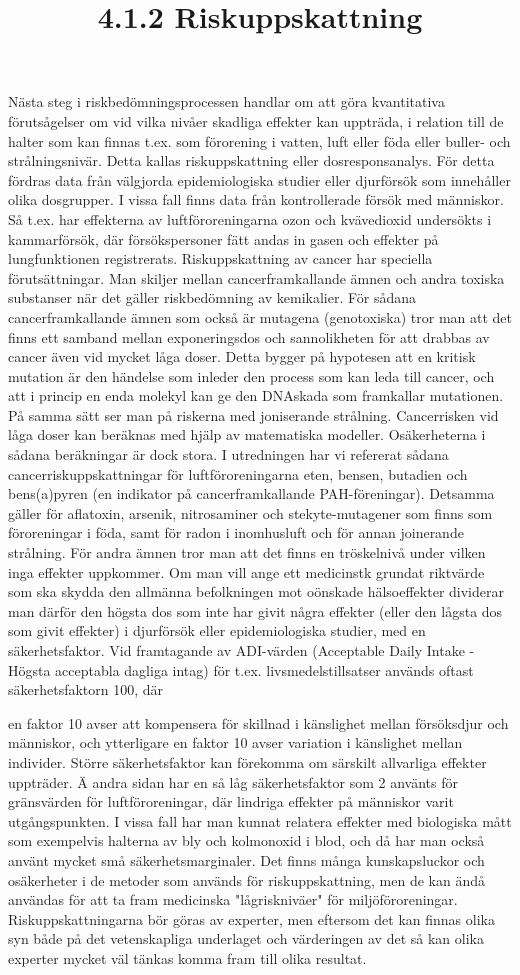 \title{
4.1.2 Riskuppskattning
}
Nästa steg i riskbedömningsprocessen handlar om att göra kvantitativa förutsågelser om vid vilka nivåer skadliga effekter kan uppträda, i relation till de halter som kan finnas t.ex. som förorening i vatten, luft eller föda eller buller- och strålningsnivär. Detta kallas riskuppskattning eller dosresponsanalys. För detta fördras data från välgjorda epidemiologiska studier eller djurförsök som innehåller olika dosgrupper. I vissa fall finns data från kontrollerade försök med människor. Så t.ex. har effekterna av luftföroreningarna ozon och kvävedioxid undersökts i kammarförsök, där försökspersoner fätt andas in gasen och effekter på lungfunktionen registrerats.
Riskuppskattning av cancer har speciella förutsättningar. Man skiljer mellan cancerframkallande ämnen och andra toxiska substanser när det gäller riskbedömning av kemikalier. För sådana cancerframkallande ämnen som också är mutagena (genotoxiska) tror man att det finns ett samband mellan exponeringsdos och sannolikheten för att drabbas av cancer även vid mycket låga doser. Detta bygger på hypotesen att en kritisk mutation är den händelse som inleder den process som kan leda till cancer, och att i princip en enda molekyl kan ge den DNAskada som framkallar mutationen. På samma sätt ser man på riskerna med joniserande strålning. Cancerrisken vid låga doser kan beräknas med hjälp av matematiska modeller. Osäkerheterna i sådana beräkningar är dock stora. I utredningen har vi refererat sådana cancerriskuppskattningar för luftföroreningarna eten, bensen, butadien och bens(a)pyren (en indikator på cancerframkallande PAH-föreningar). Detsamma gäller för aflatoxin, arsenik, nitrosaminer och stekyte-mutagener som finns som föroreningar i föda, samt för radon i inomhusluft och för annan joinerande strålning.
För andra ämnen tror man att det finns en tröskelnivå under vilken inga effekter uppkommer. Om man vill ange ett medicinstk grundat riktvärde som ska skydda den allmänna befolkningen mot oönskade hälsoeffekter dividerar man därför den högsta dos som inte har givit några effekter (eller den lågsta dos som givit effekter) i djurförsök eller epidemiologiska studier, med en säkerhetsfaktor. Vid framtagande av ADI-värden (Acceptable Daily Intake - Högsta acceptabla dagliga intag) för t.ex. livsmedelstillsatser används oftast säkerhetsfaktorn 100, där

en faktor 10 avser att kompensera för skillnad i känslighet mellan försöksdjur och människor, och ytterligare en faktor 10 avser variation i känslighet mellan individer. Större säkerhetsfaktor kan förekomma om särskilt allvarliga effekter uppträder. Ä andra sidan har en så låg säkerhetsfaktor som 2 använts för gränsvärden för luftföroreningar, där lindriga effekter på människor varit utgångspunkten. I vissa fall har man kunnat relatera effekter med biologiska mått som exempelvis halterna av bly och kolmonoxid i blod, och då har man också använt mycket små säkerhetsmarginaler.
Det finns många kunskapsluckor och osäkerheter i de metoder som används för riskuppskattning, men de kan ändå användas för att ta fram medicinska "lågriskniväer" för miljöföroreningar. Riskuppskattningarna bör göras av experter, men eftersom det kan finnas olika syn både på det vetenskapliga underlaget och värderingen av det så kan olika experter mycket väl tänkas komma fram till olika resultat.
